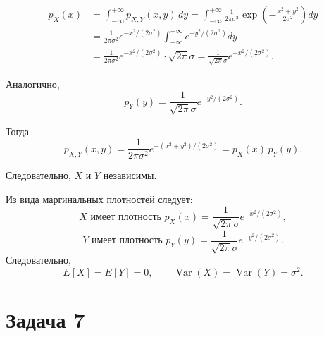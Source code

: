 \documentclass[a4paper,14pt]{extarticle}
\begin{document}
            \[
                \begin{aligned}
                    p_X(x)
                    &= \int_{-\infty}^{+\infty} p_{X,Y}(x,y)\,dy
                    = \int_{-\infty}^{+\infty} \frac{1}{2\pi\sigma^2}
                    \exp\!\left(-\frac{x^2+y^2}{2\sigma^2}\right) dy \\
                    &= \frac{1}{2\pi\sigma^2} e^{-x^2/(2\sigma^2)}
                    \int_{-\infty}^{+\infty} e^{-y^2/(2\sigma^2)} dy \\
                    &= \frac{1}{2\pi\sigma^2} e^{-x^2/(2\sigma^2)} \cdot \sqrt{2\pi}\sigma
                    = \frac{1}{\sqrt{2\pi}\sigma} e^{-x^2/(2\sigma^2)}.
                \end{aligned}
            \]
            
            Аналогично,
            \[
                p_Y(y) = \frac{1}{\sqrt{2\pi}\sigma} e^{-y^2/(2\sigma^2)}.
            \]
            
            Тогда
            \[
                p_{X,Y}(x,y)
                = \frac{1}{2\pi\sigma^2} e^{-(x^2+y^2)/(2\sigma^2)}
                = p_X(x) \, p_Y(y).
            \]
            
            Следовательно, $X$ и $Y$ независимы.
            
            Из вида маргинальных плотностей следует:
            \[
                X \text{ имеет плотность }
                p_X(x)=\frac{1}{\sqrt{2\pi}\sigma} e^{-x^2/(2\sigma^2)},\]
            \[
                Y \text{ имеет плотность }
                p_Y(y)=\frac{1}{\sqrt{2\pi}\sigma} e^{-y^2/(2\sigma^2)}.
            \]
            Следовательно,
            \[
                E[X] = E[Y] = 0, \qquad
                \operatorname{Var}(X) = \operatorname{Var}(Y) = \sigma^2.
            \]
            
            
    
    
    \section*{Задача 7}
        
\end{document}
